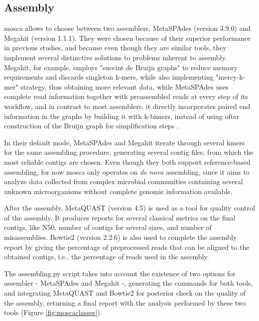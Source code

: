 \documentclass[
  oneside,
  11pt, a4paper,
  footinclude=true,
  headinclude=true,
  cleardoublepage=empty
]{scrbook}
\begin{document}
    \subsection{Assembly}
    
    \gls{mosca} allows to choose between two assemblers, MetaSPAdes (version 3.9.0) and Megahit (version 1.1.1). They were chosen because of their superior performance in previous studies, and because even though they are similar tools, they implement several distinctive solutions to problems inherent to assembly. Megahit, for example, employs "succint de Bruijn graphs" to reduce memory requirements and discards singleton k-mers, while also implementing "mercy-k-mer" strategy, thus obtaining more relevant data, while MetaSPAdes uses complete read information together with preassembled reads at every step of its workflow, and in contrast to most assemblers, it directly incorporates paired end information in the graphs by building it with k-bimers, instead of using ofter construction of the Bruijn graph for simplification steps \citep{Vollmers2017}. 
    
    In their default mode, MetaSPAdes and Megahit iterate through several kmers for the same assembling procedure, generating several contig files, from which the most reliable contigs are chosen. Even though they both support reference-based assembling, for now \gls{mosca} only operates on \textit{de novo} assembling, since it aims to analyze data collected from complex microbial communities containing several unknown microorganisms without complete genomic information available.
    
    After the assembly, MetaQUAST (version 4.5) is used as a tool for quality control of the assembly. It produces reports for several classical metrics on the final contigs, like N50, number of contigs for several sizes, and number of misassemblies. Bowtie2 (version 2.2.6) is also used to complete the assembly report by giving the percentage of preprocessed reads that can be aligned to the obtained contigs, i.e., the percentage of reads used in the assembly.
    
    The assembling.py script takes into account the existence of two options for assembler - MetaSPAdes and Megahit -, generating the commands for both tools, and integrating MetaQUAST and Bowtie2 for posterior check on the quality of the assembly, returning a final report with the analysis performed by these two  tools (Figure \ref{fig:moscaclasses}).
    
\end{document}
